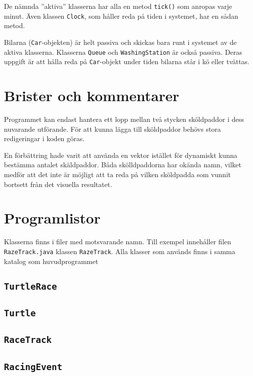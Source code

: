 \documentclass[a4paper]{article}
\newcommand{\code}[1]{\texttt{#1}} %
\begin{document}
De nämnda ''aktiva'' klasserna har alla en metod \code{tick()} som anropas varje minut. Även klassen \code{Clock}, som håller reda på tiden i systemet, har en sådan metod.

Bilarna (\code{Car}-objekten) är helt passiva och skickas bara runt i systemet av de aktiva klasserna. Klasserna \code{Queue} och \code{WashingStation} är också passiva. Deras uppgift är att hålla reda på \code{Car}-objekt under tiden bilarna står i kö eller tvättas. 


\section{Brister och kommentarer}
Programmet kan endast hantera ett lopp mellan två stycken sköldpaddor i dess nuvarande utförande. För att kunna lägga till sköldpaddor behövs stora redigeringar i koden göras.

En förbättring hade varit att använda en vektor istället för dynamiskt kunna bestämma antalet skäldpaddor.
Båda skölldpaddorna har okända namn, vilket medför att det inte är möjligt att ta reda på vilken sköldpadda som vunnit bortsett från det visuella resultatet.


\section{Programlistor}
Klasserna finns i filer med motsvarande namn. Till exempel innehåller filen  \code{RazeTrack.java} klassen \code{RazeTrack}. Alla klasser som används finns i samma katalog som huvudprogrammet

\subsection{\code{TurtleRace}}


\subsection{\code{Turtle}}

\subsection{\code{RaceTrack}}

\subsection{\code{RacingEvent}}



\end{document}
